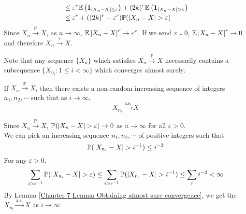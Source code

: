 \documentclass{huhtakm-template-book}
\newcommand{\prob}{\mathbb{P}}
\newcommand{\expect}{\mathbb{E}}
\begin{document}
\begin{proofing}
\begin{enumerate}
\begin{align*}
			&\leq\varepsilon^{r}\expect\left(\mathbf{1}_{\abs{X_{n}-X}\leq\varepsilon}\right)+(2k)^{r}\expect\left(\mathbf{1}_{\abs{X_{n}-X}>\varepsilon}\right)\\
			&\leq\varepsilon^{r}+((2k)^{r}-\varepsilon^{r})\prob(\abs{X_{n}-X}>\varepsilon)
		\end{align*}
		Since $X_{n}\xrightarrow{\prob}X$, as $n\to\infty$, $\expect\abs{X_{n}-X}^{r}\to\varepsilon^{r}$. If we send $\varepsilon\downarrow 0$, $\expect\abs{X_{n}-X}^{r}\to 0$ and therefore $X_{n}\xrightarrow{r}X$.
	\end{enumerate}
\end{proofing}
Note that any sequence $\{X_{n}\}$ which satisfies $X_{n}\xrightarrow{\prob}X$ necessarily contains a subsequence $\{X_{n_{i}}:1\leq i<\infty\}$ which converges almost surely.
\begin{thm}
	If $X_{n}\xrightarrow{\prob}X$, then there exists a non-random increasing sequence of integers $n_{1},n_{2},\cdots$ such that as $i\to\infty$,
	\begin{equation*}
		X_{n_{i}}\xrightarrow{\text{a.s.}}X
	\end{equation*}
\end{thm}
\begin{proofing}
	Since $X_{n}\xrightarrow{\prob}X$, $\prob(\abs{X_{n}-X}>\varepsilon)\to 0$ as $n\to\infty$ for all $\varepsilon>0$.\\
	We can pick an increasing sequence $n_{1},n_{2},\cdots$ of positive integers such that
	\begin{equation*}
		\prob(\abs{X_{n_{i}}-X}>i^{-1})\leq i^{-2}
	\end{equation*}
	For any $\varepsilon>0$,
	\begin{equation*}
		\sum_{i>\varepsilon^{-1}}\prob(\abs{X_{n_{i}}-X}>\varepsilon)\leq\sum_{i>\varepsilon^{-1}}\prob(\abs{X_{n_{i}}-X}>i^{-1})\leq\sum_{i}i^{-2}<\infty
	\end{equation*}
	By Lemma \ref{Chapter 7 Lemma Obtaining almost sure convergence}, we get the $X_{n_{i}}\xrightarrow{\text{a.s.}}X$ as $i\to\infty$
\end{proofing}

\newpage
\end{document}
